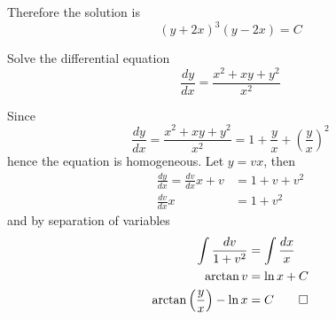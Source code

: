 Therefore the solution is
\[(y+2x)^3(y-2x)=C\]
\begin{problem}
    Solve the differential equation
    \[\frac{dy}{dx}=\frac{x^2+xy+y^2}{x^2}\]
\end{problem}
\begin{solution}
    Since
    \[\frac{dy}{dx}=\frac{x^2+xy+y^2}{x^2}
    =1+\frac{y}{x}+\left(\frac{y}{x}\right)^2\]
    hence the equation is homogeneous.
    Let \(y=vx\), then
    \begin{align*}
        \frac{dy}{dx}=\frac{dv}{dx}x+v &= 1+v+v^2 \\
        \frac{dv}{dx}x &= 1+v^2
    \end{align*}
    and by separation of variables
    \begin{align*}
        \int\frac{dv}{1+v^2} &= \int\frac{dx}{x} \\
        \arctan v &= \ln x+C \\
        \arctan\left(\frac{y}{x}\right)-\ln x &= C \qedhere
    \end{align*}
\end{solution}

